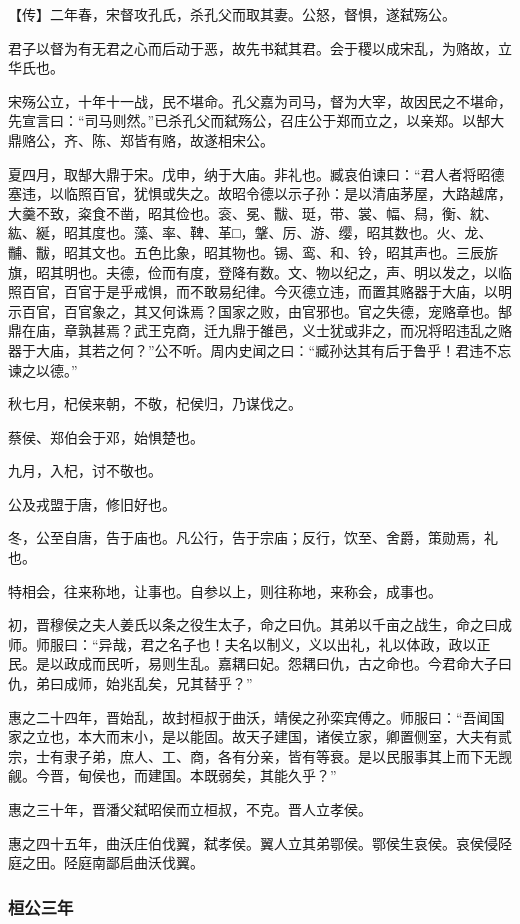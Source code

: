 \documentclass[]{article}
\begin{document}
【传】二年春，宋督攻孔氏，杀孔父而取其妻。公怒，督惧，遂弑殇公。

君子以督为有无君之心而后动于恶，故先书弑其君。会于稷以成宋乱，为赂故，立华氏也。

宋殇公立，十年十一战，民不堪命。孔父嘉为司马，督为大宰，故因民之不堪命，先宣言曰：``司马则然。''已杀孔父而弑殇公，召庄公于郑而立之，以亲郑。以郜大鼎赂公，齐、陈、郑皆有赂，故遂相宋公。

夏四月，取郜大鼎于宋。戊申，纳于大庙。非礼也。臧哀伯谏曰：``君人者将昭德塞违，以临照百官，犹惧或失之。故昭令德以示子孙：是以清庙茅屋，大路越席，大羹不致，粢食不凿，昭其俭也。衮、冕、黻、珽，带、裳、幅、舄，衡、紞、紘、綖，昭其度也。藻、率、鞞、革□，鞶、厉、游、缨，昭其数也。火、龙、黼、黻，昭其文也。五色比象，昭其物也。锡、鸾、和、铃，昭其声也。三辰旂旗，昭其明也。夫德，俭而有度，登降有数。文、物以纪之，声、明以发之，以临照百官，百官于是乎戒惧，而不敢易纪律。今灭德立违，而置其赂器于大庙，以明示百官，百官象之，其又何诛焉？国家之败，由官邪也。官之失德，宠赂章也。郜鼎在庙，章孰甚焉？武王克商，迁九鼎于雒邑，义士犹或非之，而况将昭违乱之赂器于大庙，其若之何？''公不听。周内史闻之曰：``臧孙达其有后于鲁乎！君违不忘谏之以德。''

秋七月，杞侯来朝，不敬，杞侯归，乃谋伐之。

蔡侯、郑伯会于邓，始惧楚也。

九月，入杞，讨不敬也。

公及戎盟于唐，修旧好也。

冬，公至自唐，告于庙也。凡公行，告于宗庙；反行，饮至、舍爵，策勋焉，礼也。

特相会，往来称地，让事也。自参以上，则往称地，来称会，成事也。

初，晋穆侯之夫人姜氏以条之役生太子，命之曰仇。其弟以千亩之战生，命之曰成师。师服曰：``异哉，君之名子也！夫名以制义，义以出礼，礼以体政，政以正民。是以政成而民听，易则生乱。嘉耦曰妃。怨耦曰仇，古之命也。今君命大子曰仇，弟曰成师，始兆乱矣，兄其替乎？''

惠之二十四年，晋始乱，故封桓叔于曲沃，靖侯之孙栾宾傅之。师服曰：``吾闻国家之立也，本大而末小，是以能固。故天子建国，诸侯立家，卿置侧室，大夫有贰宗，士有隶子弟，庶人、工、商，各有分亲，皆有等衰。是以民服事其上而下无觊觎。今晋，甸侯也，而建国。本既弱矣，其能久乎？''

惠之三十年，晋潘父弑昭侯而立桓叔，不克。晋人立孝侯。

惠之四十五年，曲沃庄伯伐翼，弑孝侯。翼人立其弟鄂侯。鄂侯生哀侯。哀侯侵陉庭之田。陉庭南鄙启曲沃伐翼。

\hypertarget{header-n186}{%
\subsubsection{桓公三年}\label{header-n186}}
\end{document}
